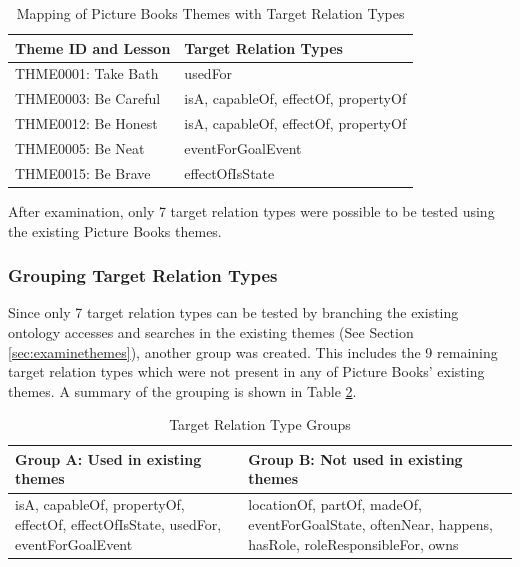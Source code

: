 \begin{table}[H]   %
\centering
\caption{Mapping of Picture Books Themes with Target Relation Types} \vspace{0.25em}
\begin{tabular}{|p{5cm}|p{5cm}|} \hline
Theme ID and Lesson & Target Relation Types \\ \hline
THME0001: Take Bath			& usedFor \\ \hline
THME0003: Be Careful		& isA, capableOf, effectOf, propertyOf \\ \hline
THME0012: Be Honest			& isA, capableOf, effectOf, propertyOf \\ \hline
THME0005: Be Neat			& eventForGoalEvent \\ \hline
THME0015: Be Brave			& effectOfIsState \\ \hline
\end{tabular}
\label{tab:mapthemerel}
\end{table}  

After examination, only 7 target relation types were possible to be tested using the existing Picture Books themes.

\subsubsection{Grouping Target Relation Types}
\label{sec:grouprel}

Since only 7 target relation types can be tested by branching the existing ontology accesses and searches in the existing themes (See Section \ref{sec:examinethemes}), another group was created. This includes the 9 remaining target relation types which were not present in any of Picture Books' existing themes. A summary of the grouping is shown in Table \ref{tab:relgroups}.

\begin{table}[H]   %
\centering
\caption{Target Relation Type Groups} \vspace{0.25em}
\begin{tabular}{|p{5cm}|p{5cm}|} \hline
Group A: Used in existing themes & Group B: Not used in existing themes \\ \hline
isA, capableOf, propertyOf, effectOf, effectOfIsState, usedFor, eventForGoalEvent	& locationOf, partOf, madeOf, eventForGoalState, oftenNear, happens, hasRole, roleResponsibleFor, owns \\ \hline
\end{tabular}
\label{tab:relgroups}
\end{table}

